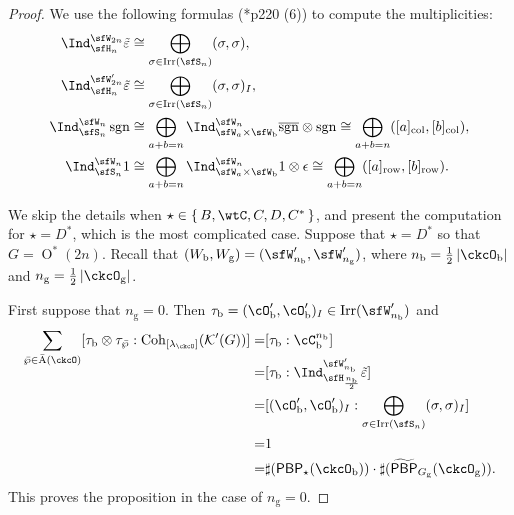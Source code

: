 \documentclass[12pt,a4paper]{amsart}
\def\abs#1{\left|{#1}\right|}
\newcommand{\CK}{{\mathcal {K}}}
\newcommand{\sgn}{\operatorname{sgn}}
\newcommand{\oO}{\operatorname{O}}
\numberwithin{equation}{section}
\theoremstyle{remark}
\def\half{{\tfrac{1}{2}}}
\def\Irr{\mathrm{Irr}}
\def\bsgn{\overline{\sgn}}
\def\nbb{n_{\mathrm b}}
\def\ngg{n_{\mathrm g}}
\def\Coh{\mathrm{Coh}}
\def\tPBP{\widetilde{\mathsf{PBP}}}
\def\PBP{\mathsf{PBP}}
\def\cOpb{\cO'_{\mathrm b}}
\def\tPBP{\widetilde{\mathsf{PBP}}}
\begin{document}
 \begin{proof}
   We use the following
  formulas (\cite{Mc}*{p220 (6)})  to compute the multiplicities:
  \begin{equation}\label{eq:indSW}
    \begin{split}
      \Ind_{\sfH_{n}}^{\sfW_{2n}} \tilde{\varepsilon}& \cong   \bigoplus_{\sigma\in \Irr(\sfS_{n})} (\sigma,\sigma),\\
      \Ind_{\sfH_{n}}^{\sfW'_{2n}} \tilde{\varepsilon} &\cong  \bigoplus_{\sigma\in \Irr(\sfS_{n})} (\sigma,\sigma)_{I},\\
      \Ind_{\sfS_{n}}^{\sfW_{n}}\sgn &\cong \bigoplus_{a+b=n}\Ind_{\sfW_{a}\times \sfW_{\mathrm b}}^{\sfW_{n}} \bsgn\otimes \sgn \cong \bigoplus_{a+b=n} ([a]_{\mathrm{col}},[b]_{\mathrm{col}}),\\
      \Ind_{\sfS_{n}}^{\sfW_{n}} 1 &\cong \bigoplus_{a+b=n}\Ind_{\sfW_{a}\times \sfW_{\mathrm b}}^{\sfW_{n}} 1 \otimes \epsilon \cong \bigoplus_{a+b=n} ([a]_{\mathrm{row}},[b]_{\mathrm{row}}).
    \end{split}
\end{equation}

  
We skip the details when $\star \in \set{B,\wtC, C,D,C^{*}}$, and present the computation for $\star = D^{*}$, which is the most complicated case.
 Suppose that $\star=D^*$ so that $G=\oO^*(2n)$.  Recall that $(W_{\mathrm b},W_{\mathrm g}) = (\sfW'_{\nbb},\sfW'_{\ngg})$, where $n_{\mathrm b}=\half \abs{\ckcO_{\mathrm b}}$ and $n_{\mathrm g}=\half\abs{\ckcO_{\mathrm g}}$.

  First suppose that $\ngg = 0$. Then $\tau_{\mathrm b} = (\cOpb,\cOpb)_{I}\in \Irr(\sfW'_{\nbb})$ and
  \[
    \begin{split}
      \sum_{\bar \wp\in \bar{\mathrm A}(\ckcO)} [\tau_{\mathrm b}\otimes \tau_{\bar \wp}: \Coh_{[\lambda_{\ckcO}]} (\CK'(G))]
       = & [\tau_{\mathrm b}:\cC_{\mathrm b}^{\nbb}]\\[-1em]
       =& 
       [\tau_{\mathrm b}: \Ind_{\sfH_{\frac{\nbb}{2}}}^{\sfW'_{\nbb}}\tilde \varepsilon]\\
      = & [(\cOpb,\cOpb)_{I}: \bigoplus_{\sigma\in \Irr(\sfS_{n})}(\sigma,\sigma)_{I}]\\
      = & 1\\
      =& \sharp (\PBP_{\star}(\ckcO_{\mathrm b}))\cdot \sharp(\tPBP_{G_{\mathrm g}}(\ckcO_{\mathrm g})).
    \end{split}
  \]
This proves the proposition in the case of  $\ngg = 0$.
  

\end{proof}
\end{document}
